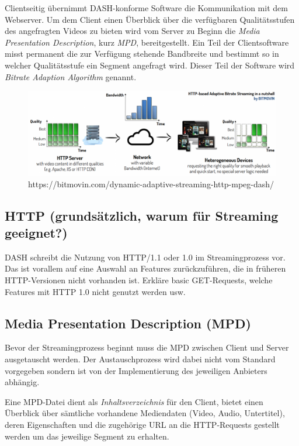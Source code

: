 \documentclass[paper = a4, fontsize = 12pt, parskip = half]{scrartcl} %
\begin{document}
Clientseitig übernimmt DASH-konforme Software die Kommunikation mit dem Webserver. Um dem Client einen Überblick über die verfügbaren Qualitätsstufen des angefragten Videos zu bieten wird vom Server zu Beginn die \textit{Media Presentation Description}, kurz \textit{MPD}, bereitgestellt. Ein Teil der Clientsoftware misst permanent die zur Verfügung stehende Bandbreite und bestimmt so in welcher Qualitätsstufe ein Segment angefragt wird. Dieser Teil der Software wird \textit{Bitrate Adaption Algorithm} genannt.

\begin{center}
	\begin{figure}
		\includegraphics[width=14cm]{images/adaptive-streaming-basic.png}
		\caption{https://bitmovin.com/dynamic-adaptive-streaming-http-mpeg-dash/}
	\end{figure}
\end{center}


\subsection{HTTP (grundsätzlich, warum für Streaming geeignet?)}
DASH schreibt die Nutzung von HTTP/1.1 oder 1.0 im Streamingprozess vor. Das ist vorallem auf eine Auswahl an Features zurückzuführen, die in früheren HTTP-Versionen nicht vorhanden ist. Erkläre basic GET-Requests, welche Features mit HTTP 1.0 nicht genutzt werden usw.

\subsection{Media Presentation Description (MPD)}
Bevor der Streamingprozess beginnt muss die MPD zwischen Client und Server ausgetauscht werden. Der Austauschprozess wird dabei nicht vom Standard vorgegeben sondern ist von der Implementierung des jeweiligen Anbieters abhängig.

Eine MPD-Datei dient als \textit{Inhaltsverzeichnis} für den Client, bietet einen Überblick über sämtliche vorhandene Mediendaten (Video, Audio, Untertitel), deren Eigenschaften und die zugehörige URL an die HTTP-Requests gestellt werden um das jeweilige Segment zu erhalten.
\end{document}
